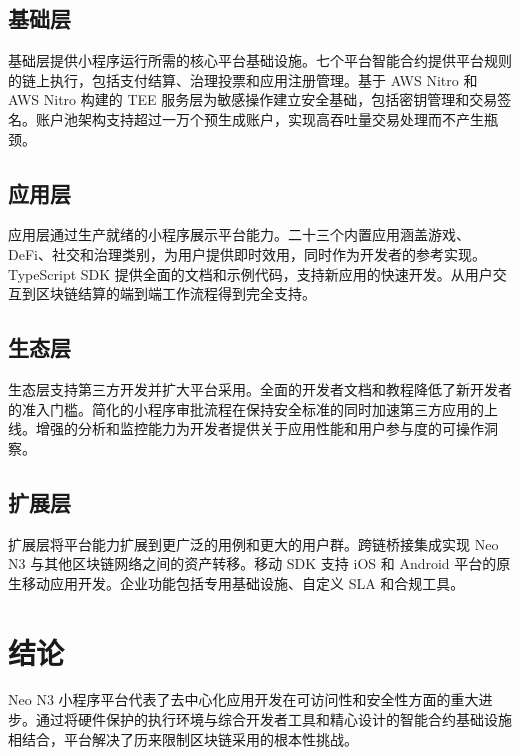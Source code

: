 \documentclass[11pt,a4paper]{article}
\begin{document}
\subsection{基础层}

基础层提供小程序运行所需的核心平台基础设施。七个平台智能合约提供平台规则的链上执行，包括支付结算、治理投票和应用注册管理。基于 AWS Nitro 和 AWS Nitro 构建的 TEE 服务层为敏感操作建立安全基础，包括密钥管理和交易签名。账户池架构支持超过一万个预生成账户，实现高吞吐量交易处理而不产生瓶颈。

\subsection{应用层}

应用层通过生产就绪的小程序展示平台能力。二十三个内置应用涵盖游戏、DeFi、社交和治理类别，为用户提供即时效用，同时作为开发者的参考实现。TypeScript SDK 提供全面的文档和示例代码，支持新应用的快速开发。从用户交互到区块链结算的端到端工作流程得到完全支持。

\subsection{生态层}

生态层支持第三方开发并扩大平台采用。全面的开发者文档和教程降低了新开发者的准入门槛。简化的小程序审批流程在保持安全标准的同时加速第三方应用的上线。增强的分析和监控能力为开发者提供关于应用性能和用户参与度的可操作洞察。

\subsection{扩展层}

扩展层将平台能力扩展到更广泛的用例和更大的用户群。跨链桥接集成实现 Neo N3 与其他区块链网络之间的资产转移。移动 SDK 支持 iOS 和 Android 平台的原生移动应用开发。企业功能包括专用基础设施、自定义 SLA 和合规工具。

\section{结论}

Neo N3 小程序平台代表了去中心化应用开发在可访问性和安全性方面的重大进步。通过将硬件保护的执行环境与综合开发者工具和精心设计的智能合约基础设施相结合，平台解决了历来限制区块链采用的根本性挑战。
\end{document}
